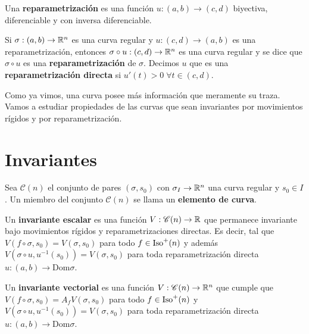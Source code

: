 \begin{defn}
Una \textbf{reparametrización} es una función $u:(a,b)\to (c,d)$ biyectiva, diferenciable y con inversa diferenciable.
\end{defn}

\begin{defn}
Si $\sigma:(a,b)\to\mathbb{R}^n$ es una curva regular y $u:(c,d)\to (a,b)$ es una reparametrización, entonces $\sigma\circ u:(c,d)\to\mathbb{R}^n$ es una curva regular y se dice que $\sigma\circ u$ es una \textbf{reparametrización} de $\sigma$. Decimos $u$ que es una \textbf{reparametrización directa} si $u'(t)>0 \;\forall t\in (c,d)$.
\end{defn}

Como ya vimos, una curva posee más información que meramente su traza. Vamos a estudiar propiedades de las curvas que sean invariantes por movimientos rígidos y por reparametrización.

\section{Invariantes}

\begin{defn}
Sea $\mathscr{C}(n)$ el conjunto de pares $(\sigma,s_0)$ con $\sigma_I\to\mathbb{R}^n$ una curva regular y $s_0\in I$. Un miembro del conjunto $\mathscr{C}(n)$ se llama un \textbf{elemento de curva}.
\end{defn}

\begin{defn}
Un \textbf{invariante escalar} es una función $V:\mathscr{C}(n)\to\mathbb{R}$ que permanece invariante bajo movimientos rígidos y reparametrizaciones directas. Es decir, tal que $V(f\circ\sigma,s_0) = V(\sigma,s_0)$ para todo $f\in\operatorname{Iso}^+(n)$ y además $V(\sigma\circ u,u^{-1}(s_0)) = V(\sigma,s_0)$ para toda reparametrización directa $u:(a,b)\to \mathrm{Dom}\sigma$.
\end{defn}

\begin{defn}
Un \textbf{invariante vectorial} es una función $V:\mathscr{C}(n)\to\mathbb{R}^n$ que cumple que $V(f\circ\sigma,s_0)=A_f V(\sigma,s_0)$ para todo $f\in\operatorname{Iso}^+(n)$ y $V(\sigma\circ u,u^{-1}(s_0)) = V(\sigma,s_0)$ para toda reparametrización directa $u:(a,b)\to\mathrm{Dom}\sigma$.
\end{defn}


